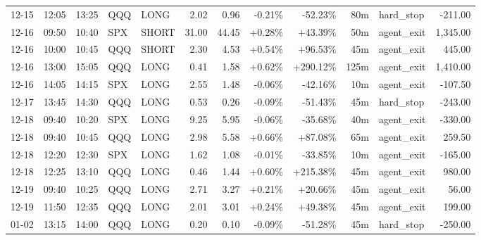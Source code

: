 \documentclass[11pt,a4paper,twoside]{article}
\begin{document}
\begin{center}
\begin{longtable}{>{\color{txtmain}}l l l l l r r r r r >{\color{txtmain}}l r}
12-15 & 12:05 & 13:25 & QQQ & LONG & 2.02 & 0.96 & \textcolor{lossred}{-0.21\%} & \textcolor{lossred}{-52.23\%} & 80m & hard\_stop & \textcolor{lossred}{-211.00} \\
12-16 & 09:50 & 10:40 & SPX & SHORT & 31.00 & 44.45 & \textcolor{wingreen}{+0.28\%} & \textcolor{wingreen}{+43.39\%} & 50m & agent\_exit & \textcolor{wingreen}{1,345.00} \\
12-16 & 10:00 & 10:45 & QQQ & SHORT & 2.30 & 4.53 & \textcolor{wingreen}{+0.54\%} & \textcolor{wingreen}{+96.53\%} & 45m & agent\_exit & \textcolor{wingreen}{445.00} \\
12-16 & 13:00 & 15:05 & QQQ & LONG & 0.41 & 1.58 & \textcolor{wingreen}{+0.62\%} & \textcolor{wingreen}{+290.12\%} & 125m & agent\_exit & \textcolor{wingreen}{1,410.00} \\
12-16 & 14:05 & 14:15 & SPX & LONG & 2.55 & 1.48 & \textcolor{lossred}{-0.06\%} & \textcolor{lossred}{-42.16\%} & 10m & agent\_exit & \textcolor{lossred}{-107.50} \\
12-17 & 13:45 & 14:30 & QQQ & LONG & 0.53 & 0.26 & \textcolor{lossred}{-0.09\%} & \textcolor{lossred}{-51.43\%} & 45m & hard\_stop & \textcolor{lossred}{-243.00} \\
12-18 & 09:40 & 10:20 & SPX & LONG & 9.25 & 5.95 & \textcolor{lossred}{-0.06\%} & \textcolor{lossred}{-35.68\%} & 40m & agent\_exit & \textcolor{lossred}{-330.00} \\
12-18 & 09:40 & 10:45 & QQQ & LONG & 2.98 & 5.58 & \textcolor{wingreen}{+0.66\%} & \textcolor{wingreen}{+87.08\%} & 65m & agent\_exit & \textcolor{wingreen}{259.50} \\
12-18 & 12:20 & 12:30 & SPX & LONG & 1.62 & 1.08 & \textcolor{lossred}{-0.01\%} & \textcolor{lossred}{-33.85\%} & 10m & agent\_exit & \textcolor{lossred}{-165.00} \\
12-18 & 12:25 & 13:10 & QQQ & LONG & 0.46 & 1.44 & \textcolor{wingreen}{+0.60\%} & \textcolor{wingreen}{+215.38\%} & 45m & agent\_exit & \textcolor{wingreen}{980.00} \\
12-19 & 09:40 & 10:25 & QQQ & LONG & 2.71 & 3.27 & \textcolor{wingreen}{+0.21\%} & \textcolor{wingreen}{+20.66\%} & 45m & agent\_exit & \textcolor{wingreen}{56.00} \\
12-19 & 11:50 & 12:35 & QQQ & LONG & 2.01 & 3.01 & \textcolor{wingreen}{+0.24\%} & \textcolor{wingreen}{+49.38\%} & 45m & agent\_exit & \textcolor{wingreen}{199.00} \\
01-02 & 13:15 & 14:00 & QQQ & LONG & 0.20 & 0.10 & \textcolor{lossred}{-0.09\%} & \textcolor{lossred}{-51.28\%} & 45m & hard\_stop & \textcolor{lossred}{-250.00} \\

\end{longtable}
\end{center}
\end{document}
